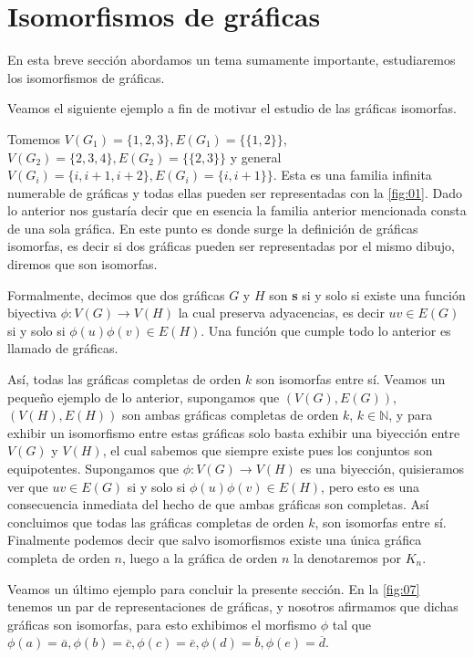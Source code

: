 \section{Isomorfismos de gráficas}
\label{sec:Isomorfismos}
En esta breve sección abordamos un tema sumamente importante, estudiaremos los
isomorfismos de gráficas.

Veamos el siguiente ejemplo a fin de motivar el estudio de las gráficas
isomorfas.

Tomemos $V(G_1)=\{ 1,2,3\}, E(G_1)=\{ \{1,2\} \}$, $V(G_2)=\{2,3,4 \}, E(G_2)=\{
\{2,3\} \}$ y general $V(G_i)=\{ i, i+1,i+2\}, E(G_i)=\{ i,i+1\} \}$. Esta es
una familia infinita numerable de gráficas y todas ellas pueden ser
representadas con la \cref{fig:01}. Dado lo anterior nos gustaría decir que en
esencia la familia anterior mencionada consta de una sola gráfica. En este punto
es donde surge la definición de gráficas isomorfas, es decir si dos gráficas
pueden ser representadas por el mismo dibujo, diremos que son isomorfas. 

Formalmente, decimos que dos gráficas $G$ y $H$ son
\textbf{s} si y solo si existe una función
biyectiva $\phi \colon V(G) \to V(H)$ la cual preserva adyacencias, es decir
$uv\in E(G)$ si y solo si $\phi(u)\phi(v)\in E(H)$. Una función que cumple todo
lo anterior es llamado  de gráficas.

Así, todas las gráficas completas de orden $k$ son isomorfas entre sí. Veamos un
pequeño ejemplo de lo anterior, supongamos que $(V(G),E(G))$, $(V(H),E(H))$ son
ambas gráficas completas de orden $k$, $k\in \mathbb{N}$, y para exhibir un
isomorfismo entre estas gráficas solo basta exhibir una biyección entre $V(G)$ y
$V(H)$, el cual sabemos que siempre existe pues los conjuntos son equipotentes.
Supongamos que $\phi: V(G) \longrightarrow V(H)$ es una biyección, quisieramos
ver que $uv\in E(G)$ si y solo si $\phi(u)\phi(v)\in E(H)$, pero esto es una
consecuencia inmediata del hecho de que ambas gráficas son completas. Así
concluimos que todas las gráficas completas de orden $k$, son isomorfas entre
sí. Finalmente podemos decir que salvo isomorfismos existe una única gráfica
completa de orden $n$, luego a la gráfica de orden $n$ la denotaremos por $K_n$.

Veamos un último ejemplo para concluir la presente sección. En la \cref{fig:07}
tenemos un par de representaciones de gráficas, y nosotros afirmamos que dichas
gráficas son isomorfas, para esto exhibimos el morfismo $\phi$ tal que
$\phi(a)=\overline{a}, \phi(b)=\overline{c}, \phi(c)=\overline{e},
\phi(d)=\overline{b}, \phi(e)=\overline{d} $.

